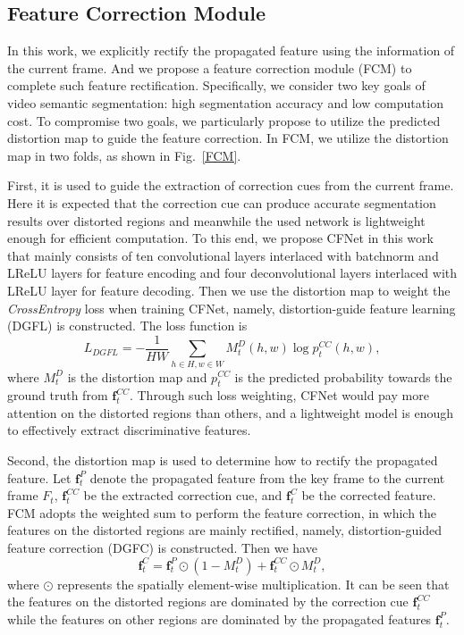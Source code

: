 \documentclass[journal]{IEEEtran}
\begin{document}
\subsection{Feature Correction Module}

In this work, we explicitly rectify the propagated feature using the information of the current frame.  And we propose a feature correction module (FCM) to complete such feature rectification. Specifically, we consider two key goals of video semantic segmentation: high segmentation accuracy and low computation cost. To compromise two goals, we particularly propose to utilize the predicted distortion map to guide the feature correction.
In FCM, we utilize the distortion map in two folds, as shown in Fig.~\ref{FCM}. 

First, it is used to guide the extraction of correction cues from the current frame. Here it is expected that the correction cue can produce accurate  segmentation results over distorted regions and meanwhile the used network is lightweight enough for efficient computation. To this end, we propose CFNet in this work that mainly consists of ten convolutional layers interlaced with batchnorm and LReLU layers for feature encoding and four deconvolutional layers interlaced with LReLU layer for feature decoding. Then we use the distortion map to weight the \textit{CrossEntropy} loss when training CFNet, namely, distortion-guide feature learning (DGFL) is constructed. The loss function is
\begin{equation}
L_{DGFL}=-\frac{1}{HW}\sum_{h \in H,w \in W}M^{D}_{t}(h,w)\log{p_{t}^{CC}(h,w)},
\end{equation}
where $M^{D}_{t}$ is the distortion map and $p_{t}^{CC}$ is the predicted probability towards the ground truth from $\mathbf{f}_{t}^{CC}$. Through such loss weighting, CFNet would pay more attention on the distorted regions than others, and a lightweight model is enough to effectively extract discriminative features.

Second, the distortion map is used to determine how to rectify the propagated feature. Let $\mathbf{f}^{P}_{t}$ denote the propagated feature from the key frame to the current frame $F_{t}$,  $\mathbf{f}^{CC}_{t}$  be the extracted correction cue, and $\mathbf{f}^{C}_{t}$ be the corrected feature. 
FCM adopts the weighted sum to perform the feature correction, in which the features on the distorted regions are mainly rectified,  namely, distortion-guided feature correction (DGFC) is constructed. Then we have
\begin{equation}
\mathbf{f}^{C}_{t}=\mathbf{f}^{P}_{t}\odot(1-M^{D}_{t})+\mathbf{f}^{CC}_{t}\odot M^{D}_{t},
\end{equation}
where $\odot$ represents the spatially element-wise multiplication.
It can be seen that the features on the distorted regions are dominated by the correction cue $\mathbf{f}^{CC}_{t}$ while the features on other regions are dominated by the propagated features $\mathbf{f}^{P}_{t}$.
\end{document}

